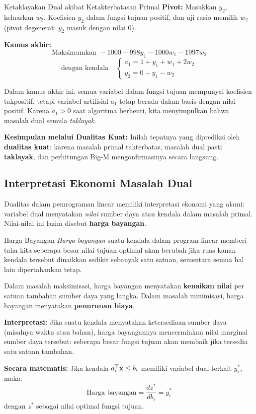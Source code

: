 \begin{example}{Ketaklayakan Dual akibat Ketakterbatasan Primal}
\textbf{Pivot:} Masukkan \( y_2 \), keluarkan \( w_2 \). Koefisien \( y_2 \) dalam fungsi tujuan positif, dan uji rasio memilih \( w_2 \) (pivot degenerat: \( y_2 \) masuk dengan nilai \( 0 \)).

\textbf{Kamus akhir:}
\[
\text{Maksimumkan } -1000 - 998y_1 - 1000w_1 - 1997w_2
\]
\[
\text{dengan kendala} \quad
\begin{cases}
a_1 = 1 + y_1 + w_1 + 2w_2 \\
y_2 = 0 - y_1 - w_2
\end{cases}
\]

Dalam kamus akhir ini, semua variabel dalam fungsi tujuan mempunyai koefisien takpositif, tetapi variabel artifisial \( a_1 \) tetap berada dalam basis dengan nilai positif. Karena \( a_1 > 0 \) saat algoritma berhenti, kita menyimpulkan bahwa masalah dual semula \emph{taklayak}.

\textbf{Kesimpulan melalui Dualitas Kuat:}
Inilah tepatnya yang diprediksi oleh \textbf{dualitas kuat}: karena masalah primal takterbatas, masalah dual pasti \textbf{taklayak}, dan perhitungan Big-M mengonfirmasinya secara langsung.

\end{example}

\subsection{Interpretasi Ekonomi Masalah Dual}
\label{sec:duality-economic}

Dualitas dalam pemrograman linear memiliki interpretasi ekonomi yang alami: variabel dual menyatakan \emph{nilai} sumber daya atau kendala dalam masalah primal. Nilai-nilai ini lazim disebut \textbf{harga bayangan}.

\vspace{1em}
\begin{definition}{Harga Bayangan}
\emph{Harga bayangan} suatu kendala dalam program linear memberi tahu kita seberapa besar nilai tujuan optimal akan berubah jika ruas kanan kendala tersebut dinaikkan sedikit sebanyak satu satuan, sementara semua hal lain dipertahankan tetap.

\smallskip
Dalam masalah maksimisasi, harga bayangan menyatakan \textbf{kenaikan nilai} per satuan tambahan sumber daya yang langka. Dalam masalah minimisasi, harga bayangan menyatakan \textbf{penurunan biaya}.

\smallskip
\textbf{Interpretasi:}
Jika suatu kendala menyatakan ketersediaan sumber daya (misalnya waktu atau bahan), harga bayangannya mencerminkan nilai marginal sumber daya tersebut: seberapa besar fungsi tujuan akan membaik jika tersedia satu satuan tambahan.

\smallskip
\textbf{Secara matematis:}
Jika kendala \( a_i^\top \mathbf{x} \leq b_i \) memiliki variabel dual terkait \( y_i^* \), maka:
\[
\text{Harga bayangan} = \frac{d z^*}{d b_i} = y_i^*
\]
dengan \( z^* \) sebagai nilai optimal fungsi tujuan.
\end{definition}


